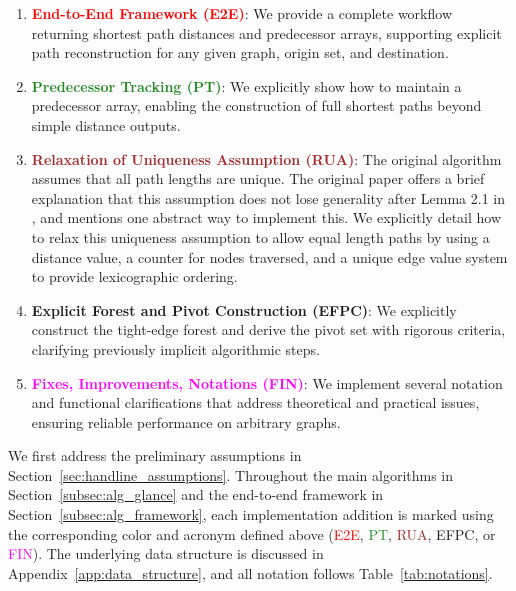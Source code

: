 \documentclass[ijoc,blindrev]{informs3} %
\begin{document}
\begin{enumerate}
\item \textcolor{Red}{\textbf{End-to-End Framework (E2E)}}:
We provide a complete workflow returning shortest path distances and predecessor arrays, supporting explicit path reconstruction for any given graph, origin set, and destination.

\item \textcolor{ForestGreen}{\textbf{Predecessor Tracking (PT)}}:
We explicitly show how to maintain a predecessor array, enabling the construction of full shortest paths beyond simple distance outputs.

\item \textcolor{Brown}{\textbf{Relaxation of Uniqueness Assumption (RUA)}}:
The original algorithm assumes that all path lengths are unique. The original paper offers a brief explanation that this {\color{blue}assumption does not lose generality after Lemma 2.1 in \cite{duan_breaking_2025}, and mentions one abstract way to implement this. We explicitly detail how to relax this uniqueness assumption to allow equal length paths} by using a distance value, a counter for nodes traversed, and a unique edge value system to provide lexicographic ordering.

\item \textcolor{Bittersweet}{\textbf{Explicit Forest and Pivot Construction (EFPC)}}:
We explicitly construct the tight-edge forest and derive the pivot set with rigorous criteria, clarifying previously implicit algorithmic steps.

\item \textcolor{Fuchsia}{\textbf{Fixes, Improvements, Notations (FIN)}}:
We implement several notation {\color{blue}and functional} clarifications that address theoretical and practical issues, ensuring reliable performance on arbitrary graphs. %
\end{enumerate}

We first address the preliminary assumptions in Section~\ref{sec:handline_assumptions}. {\color{blue}Throughout the main algorithms in Section~\ref{subsec:alg_glance} and the end-to-end framework in Section~\ref{subsec:alg_framework}, each implementation addition is marked using the corresponding color and acronym defined above (\textcolor{Red}{E2E}, \textcolor{ForestGreen}{PT}, \textcolor{Brown}{RUA}, \textcolor{Bittersweet}{EFPC}, or \textcolor{Fuchsia}{FIN}). The underlying data structure is discussed in Appendix~\ref{app:data_structure}, and all notation follows Table~\ref{tab:notations}.}
\end{document}

